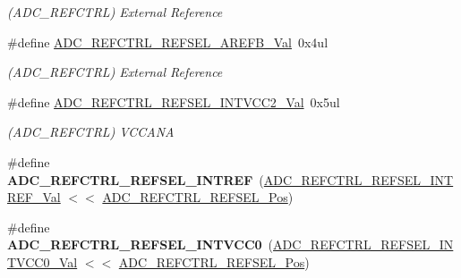 \begin{DoxyCompactItemize}
\begin{DoxyCompactList}\small\item\em (A\+D\+C\+\_\+\+R\+E\+F\+C\+T\+R\+L) External Reference \end{DoxyCompactList}\item 
\hypertarget{group___s_a_m_l21___a_d_c_ga6d43250a0758129bc25bc5c183ae25c3}{}\#define \hyperlink{group___s_a_m_l21___a_d_c_ga6d43250a0758129bc25bc5c183ae25c3}{A\+D\+C\+\_\+\+R\+E\+F\+C\+T\+R\+L\+\_\+\+R\+E\+F\+S\+E\+L\+\_\+\+A\+R\+E\+F\+B\+\_\+\+Val}~0x4ul\label{group___s_a_m_l21___a_d_c_ga6d43250a0758129bc25bc5c183ae25c3}

\begin{DoxyCompactList}\small\item\em (A\+D\+C\+\_\+\+R\+E\+F\+C\+T\+R\+L) External Reference \end{DoxyCompactList}\item 
\hypertarget{group___s_a_m_l21___a_d_c_ga8322e439473c9a04c96228a696f58e35}{}\#define \hyperlink{group___s_a_m_l21___a_d_c_ga8322e439473c9a04c96228a696f58e35}{A\+D\+C\+\_\+\+R\+E\+F\+C\+T\+R\+L\+\_\+\+R\+E\+F\+S\+E\+L\+\_\+\+I\+N\+T\+V\+C\+C2\+\_\+\+Val}~0x5ul\label{group___s_a_m_l21___a_d_c_ga8322e439473c9a04c96228a696f58e35}

\begin{DoxyCompactList}\small\item\em (A\+D\+C\+\_\+\+R\+E\+F\+C\+T\+R\+L) V\+C\+C\+A\+N\+A \end{DoxyCompactList}\item 
\hypertarget{group___s_a_m_l21___a_d_c_ga9b4af3e91e117de6f7764ac9e0a238ea}{}\#define {\bfseries A\+D\+C\+\_\+\+R\+E\+F\+C\+T\+R\+L\+\_\+\+R\+E\+F\+S\+E\+L\+\_\+\+I\+N\+T\+R\+E\+F}~(\hyperlink{group___s_a_m_l21___a_d_c_ga1911e56f34fa20c40f0be6888f81cbed}{A\+D\+C\+\_\+\+R\+E\+F\+C\+T\+R\+L\+\_\+\+R\+E\+F\+S\+E\+L\+\_\+\+I\+N\+T\+R\+E\+F\+\_\+\+Val} $<$$<$ \hyperlink{group___s_a_m_l21___a_d_c_ga7b8a65054da09cd11886d730594eb8d3}{A\+D\+C\+\_\+\+R\+E\+F\+C\+T\+R\+L\+\_\+\+R\+E\+F\+S\+E\+L\+\_\+\+Pos})\label{group___s_a_m_l21___a_d_c_ga9b4af3e91e117de6f7764ac9e0a238ea}

\item 
\hypertarget{group___s_a_m_l21___a_d_c_ga1e75557de29b2c04f2733299f2b1d71e}{}\#define {\bfseries A\+D\+C\+\_\+\+R\+E\+F\+C\+T\+R\+L\+\_\+\+R\+E\+F\+S\+E\+L\+\_\+\+I\+N\+T\+V\+C\+C0}~(\hyperlink{group___s_a_m_l21___a_d_c_gae5db462246782f67edf39fecc67bf742}{A\+D\+C\+\_\+\+R\+E\+F\+C\+T\+R\+L\+\_\+\+R\+E\+F\+S\+E\+L\+\_\+\+I\+N\+T\+V\+C\+C0\+\_\+\+Val} $<$$<$ \hyperlink{group___s_a_m_l21___a_d_c_ga7b8a65054da09cd11886d730594eb8d3}{A\+D\+C\+\_\+\+R\+E\+F\+C\+T\+R\+L\+\_\+\+R\+E\+F\+S\+E\+L\+\_\+\+Pos})\label{group___s_a_m_l21___a_d_c_ga1e75557de29b2c04f2733299f2b1d71e}


\end{DoxyCompactItemize}

